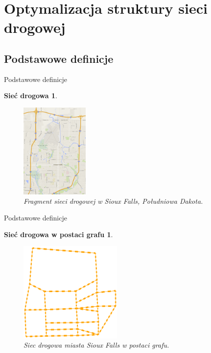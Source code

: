 \documentclass{beamer}
\begin{document}
\section{Optymalizacja struktury sieci drogowej}

\subsection{Podstawowe definicje}
\begin{frame}{Podstawowe definicje} 

\newtheorem{mydef1}{Sieć drogowa}
\begin{mydef1}
	\begin{figure}[h!]
	\includegraphics[width=0.30\textwidth]{img/siec}
	\caption{Fragment sieci drogowej w Sioux Falls, Południowa Dakota.} 
	\end{figure}
\end{mydef1}

\end{frame}

\begin{frame}{Podstawowe definicje} 

\newtheorem{mydef2}{Sieć drogowa w postaci grafu}
\begin{mydef2}
	\begin{figure}[h!]
	\includegraphics[width=0.45\textwidth]{img/graf}
	\caption{Siec drogowa miasta Sioux Falls w postaci grafu.} 
	\end{figure}
\end{mydef2}

\end{frame}
\end{document}
